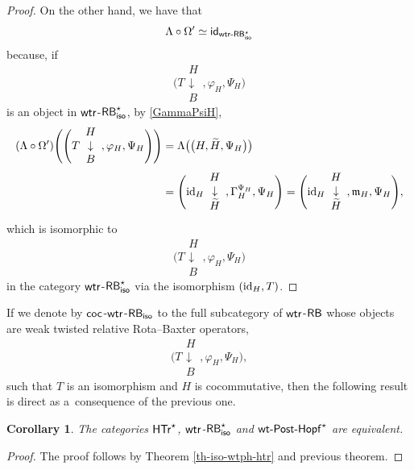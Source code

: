 \documentclass[10pt,a4paper]{amsart}
\numberwithin{equation}{section}
\newtheorem{Corollary}[Theorem]{Corollary}
\begin{document}
\begin{proof}
On the other hand, we have that \[\Lambda\circ\Omega'\simeq{\sf id}_{{\sf wtr}\textnormal{-}{\sf RB}^{\star}_{{\sf iso}}}\]
because, if
\[
\Biggl(T\begin{array}{c}H\\\downarrow\\B\end{array},\varphi_{H},\Psi_{H}\Biggr)
\]
is an object in ${\sf wtr}$-${\sf RB}^{\star}_{{\sf iso}}$,
by \eqref{GammaPsiH},
\begin{align*}
(\Lambda\circ\Omega')\Biggl(\Biggl(T\begin{array}{c}H\\\downarrow\\B\end{array},\varphi_{H},\Psi_{H}\Biggr)\Biggr)
&{}=\Lambda\bigl(\bigl(H,\widetilde{H},\Psi_{H}\bigr)\bigr)\\
&{}=\Biggl({\rm id}_{H}\begin{array}{c}H\\\downarrow\\\widetilde{H}\end{array},\Gamma_{H}^{\Psi_{H}},\Psi_{H}\Biggr)
 =\Biggl({\rm id}_{H}\begin{array}{c}H\\\downarrow\\\widetilde{H}\end{array},\mathfrak{m}_{H},\Psi_{H}\Biggr),
\end{align*}
which is isomorphic to
\[
\Biggl(T\begin{array}{c}H\\\downarrow\\B\end{array},\varphi_{H},\Psi_{H}\Biggr)
\] in the category ${\sf wtr}$-${\sf RB}^{\star}_{{\sf iso}}$ via the isomorphism $({\rm id}_{H},T)$.
\end{proof}

If we denote by ${\sf coc}$-${\sf wtr}$-${\sf RB}_{{\sf iso}}$ to the full subcategory of ${\sf wtr}$-${\sf RB}$ whose objects are weak twisted relative Rota--Baxter operators,
\[
\Biggl(T\begin{array}{c}H\\\downarrow\\B\end{array},\varphi_{H},\Psi_{H}\Biggr),
\]
such that $T$ is an isomorphism and $H$ is cocommutative, then the following result is direct as a~consequence of the previous one.
\begin{Corollary}

The categories $\sf{HTr}^{\star}$, ${\sf wtr}$-${\sf RB}^{\star}_{{\sf iso}}$ and ${\sf wt}\textnormal{-}{\sf Post}\textnormal{-}{\sf Hopf}^{\star}$ are equivalent.
\end{Corollary}
\begin{proof}
The proof follows by Theorem \ref{th-iso-wtph-htr} and previous theorem.
\end{proof}
\end{document}
